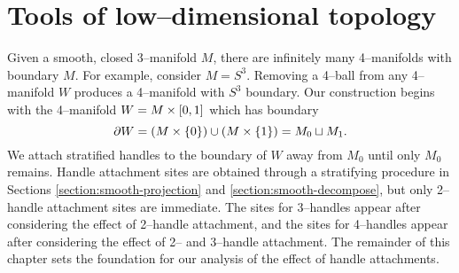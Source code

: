\chapter{Tools of low--dimensional topology}
\label{chapter:problem}

Given a smooth, closed 3--manifold $M$, there are infinitely many 4--manifolds with boundary $M$.
For example, consider $M=S^3$.
Removing a 4--ball from any 4--manifold $W$ produces a 4--manifold with $S^3$ boundary.
Our construction begins with the 4--manifold $W=M\times [0,1]$ which has boundary
\[
\partial W = (M\times\{0\}) \cup (M\times\{1\}) = M_0 \sqcup M_1.
\]
We attach stratified handles to the boundary of $W$ away from $M_0$ until only $M_0$ remains.
Handle attachment sites are obtained through a stratifying procedure in Sections \ref{section:smooth-projection} and \ref{section:smooth-decompose}, but only 2--handle attachment sites are immediate.
The sites for 3--handles appear after considering the effect of 2--handle attachment, and the sites for 4--handles appear after considering the effect of 2-- and 3--handle attachment.
The remainder of this chapter sets the foundation for our analysis of the effect of handle attachments.







